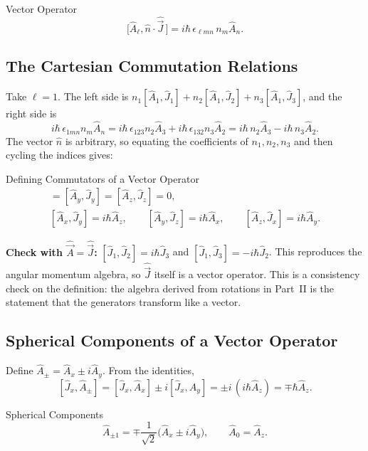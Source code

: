 \documentclass[11pt,a4paper]{article}
\begin{document}
\begin{thm}{Vector Operator}
\[
\big[\hat A_\ell,\hat n\cdot\hat{\vec J}\,\big]=i\hbar\,\epsilon_{\ell mn}\,n_m\hat A_n .
\]
\end{thm}

\subsection{The Cartesian Commutation Relations}
Take $\ell=1$. The left side is $n_1[\hat A_1,\hat J_1]+n_2[\hat A_1,\hat J_2]+n_3[\hat A_1,\hat J_3]$, and the right side is
\[
i\hbar\,\epsilon_{1mn}n_m\hat A_n=i\hbar\,\epsilon_{123}n_2\hat A_3+i\hbar\,\epsilon_{132}n_3\hat A_2=i\hbar\,n_2\hat A_3-i\hbar\,n_3\hat A_2 .
\]
The vector $\hat n$ is arbitrary, so equating the coefficients of $n_1,n_2,n_3$ and then cycling the indices gives:
\begin{thm}{Defining Commutators of a Vector Operator}
\begin{gather*}
[\hat A_x,\hat J_x]=[\hat A_y,\hat J_y]=[\hat A_z,\hat J_z]=0,\\
[\hat A_x,\hat J_y]=i\hbar\hat A_z,\qquad[\hat A_y,\hat J_z]=i\hbar\hat A_x,\qquad[\hat A_z,\hat J_x]=i\hbar\hat A_y .
\end{gather*}
\end{thm}

\textbf{Check with $\hat{\vec A}=\hat{\vec J}$:} $[\hat J_1,\hat J_2]=i\hbar\hat J_3$ and $[\hat J_1,\hat J_3]=-i\hbar\hat J_2$. This reproduces the angular momentum algebra, so $\hat{\vec J}$ itself is a vector operator. This is a consistency check on the definition: the algebra derived from rotations in Part~II is the statement that the generators transform like a vector.

\subsection{Spherical Components of a Vector Operator}
Define $\hat A_\pm=\hat A_x\pm i\hat A_y$. From the identities,
\[
[\hat J_x,\hat A_\pm]=[\hat J_x,\hat A_x]\pm i[\hat J_x,\hat A_y]=\pm i\,(i\hbar\hat A_z)=\mp\hbar\hat A_z .
\]

\begin{thm}{Spherical Components}
\[
\hat A_{\pm1}=\mp\frac1{\sqrt2}\big(\hat A_x\pm i\hat A_y\big),\qquad \hat A_0=\hat A_z .
\]
\end{thm}
\end{document}
